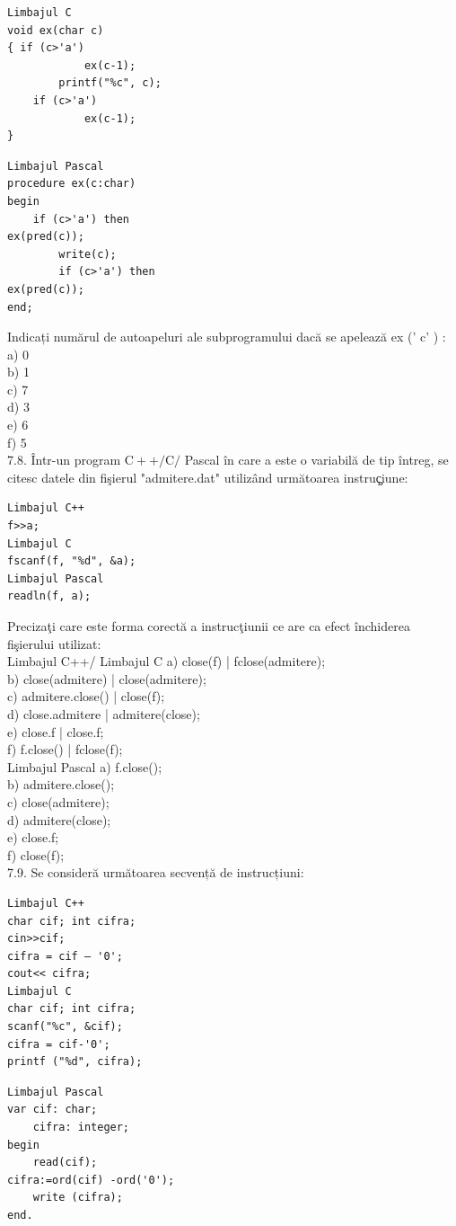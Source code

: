 \begin{verbatim}
Limbajul C
void ex(char c)
{ if (c>'a')
            ex(c-1);
        printf("%c", c);
    if (c>'a')
            ex(c-1);
}
\end{verbatim}
\begin{verbatim}
Limbajul Pascal
procedure ex(c:char)
begin
    if (c>'a') then
ex(pred(c));
        write(c);
        if (c>'a') then
ex(pred(c));
end;
\end{verbatim}
Indicați numărul de autoapeluri ale subprogramului dacă se apelează ex (' c' ) :
\\
a) 0
\\
b) 1
\\
c) 7
\\
d) 3
\\
e) 6
\\
f) 5
\\
7.8. Într-un program $\mathrm{C}++/ \mathrm{C} /$ Pascal în care a este o variabilă de tip întreg, se citesc datele din fişierul "admitere.dat" utilizând următoarea instruç̧iune:
\begin{verbatim}
Limbajul C++
f>>a;
Limbajul C
fscanf(f, "%d", &a);
Limbajul Pascal
readln(f, a);
\end{verbatim}
Precizaţi care este forma corectă a instrucţiunii ce are ca efect închiderea fişierului utilizat:
\\
Limbajul C++/ Limbajul C
a) close(f) | fclose(admitere);
\\
b) close(admitere) | close(admitere);
\\
c) admitere.close() | close(f);
\\
d) close.admitere | admitere(close);
\\
e) close.f | close.f;
\\
f) f.close() | fclose(f);
\\
Limbajul Pascal
a) f.close();
\\
b) admitere.close();
\\ 
c) close(admitere);
\\
d) admitere(close);
\\
e) close.f;
\\
f) close(f);
\\
7.9. Se consideră următoarea secvență de instrucțiuni:
\begin{verbatim}
Limbajul C++ 
char cif; int cifra; 
cin>>cif;    
cifra = cif – '0'; 
cout<< cifra;
Limbajul C
char cif; int cifra; 
scanf("%c", &cif); 
cifra = cif-'0'; 
printf ("%d", cifra);
\end{verbatim}
\begin{verbatim}
Limbajul Pascal
var cif: char;
    cifra: integer;
begin
    read(cif);
cifra:=ord(cif) -ord('0');
    write (cifra);
end.
\end{verbatim}
